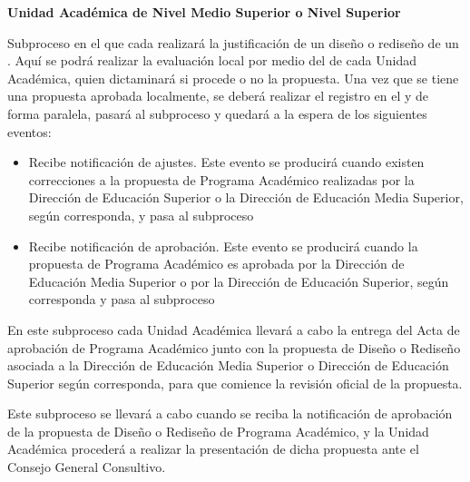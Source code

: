 \begin{PDescripcion}
	
	\Ppaso \textbf{Unidad Académica de Nivel Medio Superior o Nivel Superior}

		\begin{enumerate}

			\Ppaso[\PSubProceso]  Subproceso en el que cada   realizará la justificación de un diseño o rediseño de un . Aquí se podrá realizar la evaluación local por medio del  de cada Unidad Académica, quien dictaminará si procede o no la propuesta. Una vez que se tiene una propuesta aprobada localmente, se deberá realizar el registro en el  y de forma paralela, pasará al subproceso  y quedará a la espera de los siguientes eventos:

				\begin{itemize}
					\item Recibe notificación de ajustes. Este evento se producirá cuando existen correcciones a la propuesta de Programa Académico realizadas por la Dirección de Educación Superior o la Dirección de Educación Media Superior, según corresponda, y pasa al subproceso 
					\item Recibe notificación de aprobación. Este evento se producirá cuando la propuesta de Programa Académico es aprobada por la Dirección de Educación Media Superior o por la Dirección de Educación Superior, según corresponda y pasa al subproceso 
				\end{itemize}

			\Ppaso[\PSubProceso]  En este subproceso cada Unidad Académica llevará a cabo la entrega del Acta de aprobación de Programa Académico junto con la propuesta de Diseño o Rediseño asociada a la Dirección de Educación Media Superior o Dirección de Educación Superior según corresponda, para que comience la revisión oficial de la propuesta.
	
			\Ppaso[\PSubProceso]  Este subproceso se llevará a cabo cuando se reciba la notificación de aprobación de la propuesta de Diseño o Rediseño de Programa Académico, y la Unidad Académica procederá a realizar la presentación de dicha propuesta ante el Consejo General Consultivo.
	

\end{enumerate}
\end{PDescripcion}
